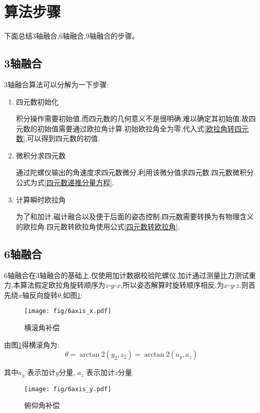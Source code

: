 
\section{算法步骤}\label{section:最终结论}
下面总结3轴融合,6轴融合,9轴融合的步骤。
\subsection{3轴融合}
3轴融合算法可以分解为一下步骤:
\begin{enumerate}
    \item 四元数初始化

        积分操作需要初始值,而四元数的几何意义不是很明确,难以确定其初始值.故四元数的初始值需要通过欧拉角计算.初始欧拉角全为零,代入式\ref{欧拉角转四元数},可以得到四元数的初值.
    \item 微积分求四元数

        通过陀螺仪输出的角速度求四元数微分,利用该微分值求四元数.四元数微积分公式为式\ref{四元数递推分量方程}.
    \item 计算瞬时欧拉角

        为了和加计,磁计融合以及便于后面的姿态控制,四元数需要转换为有物理含义的欧拉角.四元数转欧拉角使用公式\ref{四元数转欧拉角}.
\end{enumerate}

\subsection{6轴融合}
6轴融合在3轴融合的基础上,仅使用加计数据校验陀螺仪,加计通过测量比力测试重力.本算法假定欧拉角旋转顺序为$z$-$y$-$x$,所以姿态解算时旋转顺序相反,为$x$-$y$-$z$.则首先绕$x$轴反向旋转$\theta$,如图\ref{横滚角补偿}:
\begin{figure}[hbp]
\begin{center}
    \texttt{[image: fig/6axis\_x.pdf]}
    \caption{横滚角补偿}\label{横滚角补偿}
\end{center}
\end{figure}

由图\ref{横滚角补偿}得横滚角为:
\begin{equation}\label{加计横滚角}
    \theta = \arctan2(y_2,z_2) = \arctan2(a_y,a_z)
\end{equation} 

其中$a_y$   表示加计$y$分量,
$a_z$       表示加计$z$分量.
\begin{figure}
    \begin{center}
        \texttt{[image: fig/6axis\_y.pdf]}
        \caption{俯仰角补偿}\label{俯仰角补偿}
    \end{center}
\end{figure}

